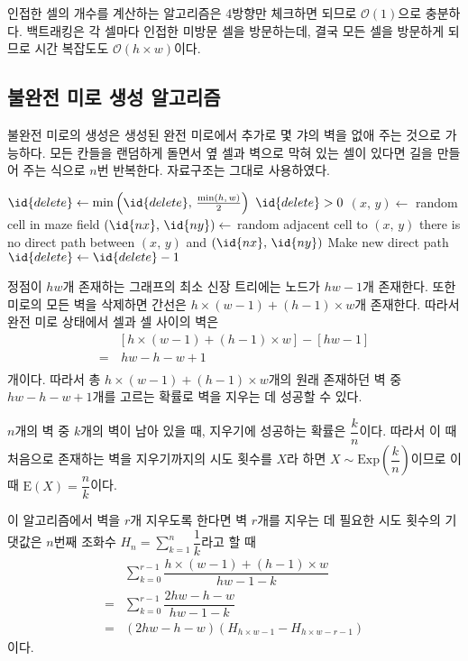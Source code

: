 인접한 셀의 개수를 계산하는 알고리즘은 4방향만 체크하면 되므로 $\mathcal{O}\left(1\right)$으로 충분하다.
백트래킹은 각 셀마다 인접한 미방문 셀을 방문하는데, 결국 모든 셀을 방문하게 되므로 시간 복잡도도 $\mathcal{O}\left(h\times w\right)$이다.

\subsection{불완전 미로 생성 알고리즘}

불완전 미로의 생성은 생성된 완전 미로에서 추가로 몇 갸의 벽을 없애 주는 것으로 가능하다. 모든 칸들을 랜덤하게 돌면서 옆 셀과 벽으로 막혀 있는 셀이 있다면
길을 만들어 주는 식으로 $n$번 반복한다. 자료구조는 그대로 사용하였다.

\begin{codebox}
\li $\id{delete} \gets \min\left(\id{delete},\,\frac{\min\left(h,\,w\right)}{2}\right)$
\li \While $\id{delete} > 0$ \Do
\li     $(x,\,y) \gets$ random cell in maze field
\li     $(\id{nx},\,\id{ny}) \gets$ random adjacent cell to $(x,\,y)$
\li     \If there is no direct path between $(x,\,y)$ and $(\id{nx},\,\id{ny})$ \Then
\li         Make new direct path
\li         $\id{delete} \gets \id{delete} - 1$
        \End
    \End
\end{codebox}

정점이 $hw$개 존재하는 그래프의 최소 신장 트리에는 노드가 $hw-1$개 존재한다. 또한 미로의 모든 벽을 삭제하면 간선은
$h \times \left(w - 1\right) + \left(h - 1\right) \times w$개 존재한다. 따라서 완전 미로 상태에서 셀과 셀 사이의
벽은
\begin{align*}
    & \left[h \times \left(w - 1\right) + \left(h - 1\right) \times w\right] - \left[hw-1\right] \\
    =&\, hw - h - w + 1 \\
\end{align*}
개이다. 따라서 총 $h \times \left(w - 1\right) + \left(h - 1\right) \times w$개의 원래 존재하던 벽 중 $hw - h - w + 1$개를
고르는 확률로 벽을 지우는 데 성공할 수 있다.

$n$개의 벽 중 $k$개의 벽이 남아 있을 때, 지우기에 성공하는 확률은 $\dfrac{k}{n}$이다. 따라서 이 때 처음으로 존재하는 벽을 지우기까지의 시도 횟수를
$X$라 하면 $X \sim \mathrm{Exp}\left(\dfrac{k}{n}\right)$이므로 이 때 $\mathrm{E}\left(X\right) = \dfrac{n}{k}$이다.

이 알고리즘에서 벽을 $r$개 지우도록 한다면 벽 $r$개를 지우는 데 필요한 시도 횟수의 기댓값은
$n$번째 조화수 $\displaystyle H_n = \sum_{k=1}^n \dfrac{1}{k}$라고 할 때
\begin{align*}
    & \sum_{k=0}^{r-1} \dfrac{h \times \left(w - 1\right) + \left(h - 1\right) \times w}{hw - 1 - k} \\
    =& \sum_{k=0}^{r-1} \dfrac{2hw - h - w}{hw - 1 - k} \\
    =& \left(2hw - h - w\right) \left(H_{h\times w - 1} - H_{h\times w - r - 1}\right)
\end{align*}
이다.

